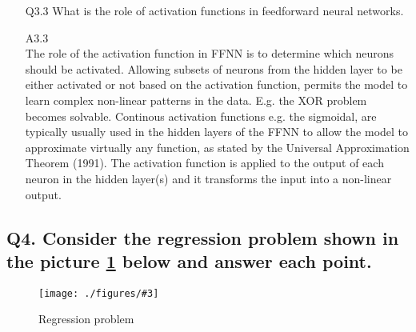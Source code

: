 \documentclass[unicode, 11pt, a4paper]{scrartcl}
\newcommand{\myFigure}[3]{
    \begin{figure}[htbp]
    \centering
    \caption{#1}
    \label{#2}
    \texttt{[image: ./figures/\#3]}
    \end{figure}
}
\begin{document}
\begin{itemize}
	\item[Q3.3] What is the role of activation functions in feedforward neural networks.

	\item[A3.3] ~\\
	      The role of the activation function in FFNN is to determine which neurons should be activated.
	      Allowing subsets of neurons from the hidden layer to be either activated or not based on the
	      activation function, permits the model to learn complex non-linear patterns in the data.
	      E.g. the XOR problem becomes solvable.
	      Continous activation functions e.g. the sigmoidal,
	      are typically usually used in the hidden layers of the FFNN to allow
	      the model to approximate virtually any function,
	      as stated by the Universal Approximation Theorem (1991).
	      The activation function is applied to the output of each neuron in the hidden layer(s)
	      and it transforms the input into a non-linear output.
\end{itemize}

\subsection*{
	Q4. Consider the regression problem shown in the picture \ref{fig:ex-q4-regression}
	below and answer each point.
}

\myFigure{Regression problem}{fig:ex-q4-regression}{parabolic.jpg}
\end{document}
